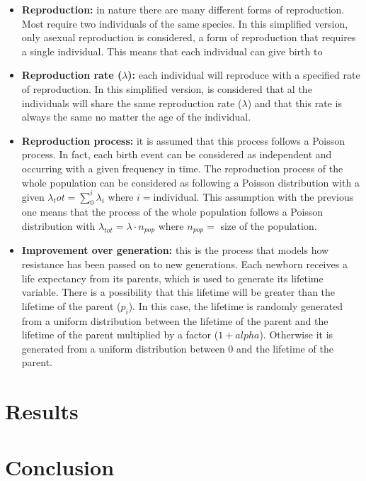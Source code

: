\documentclass[conference]{IEEEtran}
\begin{document}
    \begin{itemize}
        \item \textbf{Reproduction:} in nature there are many different forms of reproduction. Most require two individuals of the same species.
        In this simplified version, only asexual reproduction is considered, a form of reproduction that requires a single individual.
        This means that each individual can give birth to
        \item \textbf{Reproduction rate ($\lambda$):} each individual will reproduce with a specified rate of reproduction. In this simplified version, is considered that al the individuals will share the same reproduction rate ($\lambda$) and that this rate is always the same no matter the age of the individual.
        \item \textbf{Reproduction process:} it is assumed that this process follows a Poisson process. In fact, each birth event can be considered as independent and occurring with a given frequency in time. The reproduction process of the whole population can be considered as following a Poisson distribution with a given $\lambda_tot = \sum_{0}^{i}\lambda_i$ where $i=$individual. This assumption with the previous one means that the process of the whole population follows a Poisson distribution with $\lambda_{tot} = \lambda \cdot {n}_{pop}$ where ${n}_{pop}=$ size of the population. 
        \item \textbf{Improvement over generation:} this is the process that models how resistance has been passed on to new generations. Each newborn receives a life expectancy from its parents, which is used to generate its lifetime variable. There is a possibility that this lifetime will be greater than the lifetime of the parent ($p_i$). In this case, the lifetime is randomly generated from a uniform distribution between the lifetime of the parent and the lifetime of the parent multiplied by a factor ($1+alpha$). Otherwise it is generated from a uniform distribution between 0 and the lifetime of the parent.
    \end{itemize}

\section{Results}

    
\section{Conclusion}

%
%
\end{document}
